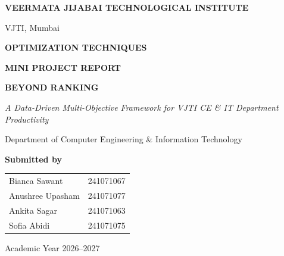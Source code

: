 \documentclass[12pt,a4paper]{report}
\begin{document}
\begin{titlepage}
\thispagestyle{empty}
\begin{center}
{\large\bfseries VEERMATA JIJABAI TECHNOLOGICAL INSTITUTE\par}
{\large VJTI, Mumbai\par}
\vspace{1.3cm}
{\Large\bfseries OPTIMIZATION TECHNIQUES\par}
{\Large\bfseries MINI PROJECT REPORT\par}
\vspace{1.7cm}
{\Huge\bfseries BEYOND RANKING\par}
\vspace{0.35cm}
{\Large\itshape A Data-Driven Multi-Objective Framework for VJTI CE \& IT Department Productivity\par}
\vspace{1.5cm}
{\large Department of Computer Engineering \& Information Technology\par}
\vspace{1.1cm}
{\large\bfseries Submitted by\par}\vspace{0.35cm}
\begin{tabular}{ll}
Bianca Sawant & 241071067\\
Anushree Upasham & 241071077\\
Ankita Sagar & 241071063\\
Sofia Abidi & 241071075
\end{tabular}
\vfill
{\large Academic Year 2026--2027\par}
\end{center}
\end{titlepage}

\tableofcontents
\clearpage
\listoffigures
\clearpage
\listoftables
\clearpage
\end{document}
